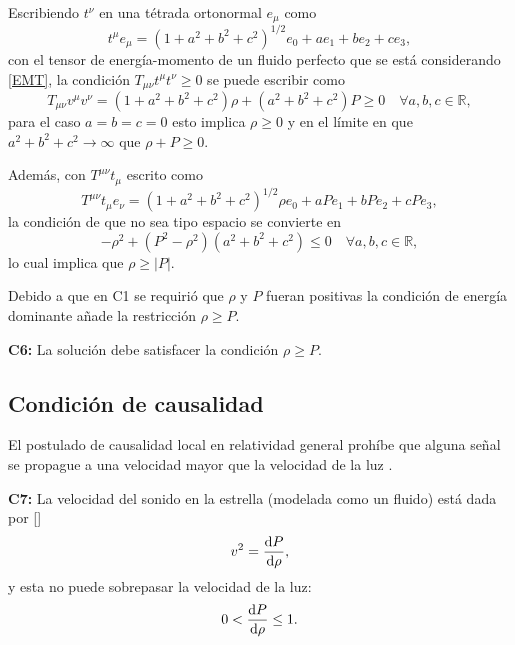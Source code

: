 Escribiendo $t^\nu$ en una tétrada ortonormal $e_{\mu}$ como
\begin{equation}
    t^{\mu} e_{\mu}= \left(1+a^{2}+b^{2}+c^{2}\right)^{1 / 2} e_{0}+a e_{1}+b e_{2}+c e_{3},
\end{equation}
con el tensor de energía-momento de un fluido perfecto que se está considerando \eqref{EMT}, la condición $T_{\mu \nu} t^{\mu} t^{\nu} \geq 0$ se puede escribir como
\begin{equation}
T_{\mu \nu} v^{\mu} v^{\nu}=\left(1+a^{2}+b^{2}+c^{2}\right) \rho + \left( a^{2} +b^{2} +c^{2} \right) P \geq 0 \quad \forall a,b,c \in \mathbb{R},
\end{equation}
para el caso $a=b=c=0$ esto implica $\rho \geq 0$ y en el límite en que $a^2+b^2+c^2 \to \infty$ que $\rho + P \geq 0$.

Además, con $T^{\mu \nu} t_{\mu}$ escrito como
\begin{equation}
T^{\mu \nu} t_{\mu}e_{\nu}=\left(1+a^{2}+b^{2}+c^{2}\right)^{1 / 2} \rho e_{0}+a P e_{1}+b P e_{2}+c P e_{3},
\end{equation}
la condición de que no sea tipo espacio se convierte en
\begin{equation}
    -\rho^2 + (P^2-\rho^2)(a^2+b^2+c^2) \leq 0 \quad \forall a,b,c \in \mathbb{R},
\end{equation}
lo cual implica que $\rho \geq |P|$.

Debido a que en C1 se requirió que $\rho$ y $P$ fueran positivas la condición de energía dominante añade la restricción $\rho \geq P$.

\textbf{C6:} La solución debe satisfacer la condición $\rho \geq P$.

\subsection*{Condición de causalidad}
El postulado de causalidad local en relatividad general prohíbe que alguna señal se propague a una velocidad mayor que la velocidad de la luz \cite{Hawking1973TheSpaceTime}. 

\textbf{C7:}  La velocidad del sonido en la estrella (modelada como un fluido) está dada por []
\begin{equation}
    v^2=\dv{P}{\rho},
\end{equation}
y esta no puede sobrepasar la velocidad de la luz:
\begin{equation}
    0 < \dv{P}{\rho} \leq 1 .
\end{equation}

